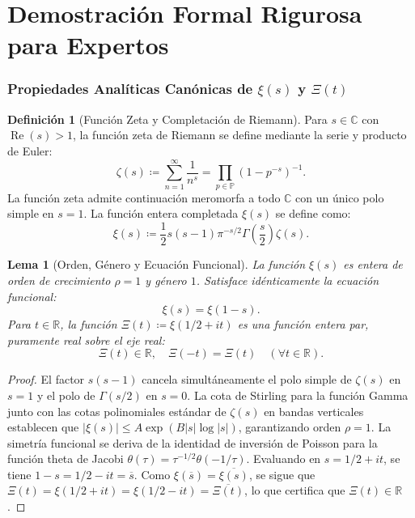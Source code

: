\documentclass[11pt,a4paper]{article}
\newtheorem{lemma}[theorem]{Lema}
\theoremstyle{definition}
\newtheorem{definition}[theorem]{Definición}
\theoremstyle{remark}
\begin{document}
\newpage

\part{Demostración Formal Rigurosa para Expertos}

\section{Propiedades Analíticas Canónicas de \texorpdfstring{$\xi(s)$}{xi(s)} y \texorpdfstring{$\Xi(t)$}{Xi(t)}}

\begin{definition}[Función Zeta y Completación de Riemann]
Para $s \in \mathbb{C}$ con $\operatorname{Re}(s) > 1$, la función zeta de Riemann se define mediante la serie y producto de Euler:
\begin{equation}
\zeta(s) \coloneqq \sum_{n=1}^\infty \frac{1}{n^s} = \prod_{p \in \mathbb{P}} \left(1 - p^{-s}\right)^{-1}.
\end{equation}
La función zeta admite continuación meromorfa a todo $\mathbb{C}$ con un único polo simple en $s=1$. La función entera completada $\xi(s)$ se define como:
\begin{equation}
\xi(s) \coloneqq \frac{1}{2} s(s - 1) \pi^{-s/2} \Gamma\left(\frac{s}{2}\right) \zeta(s).
\end{equation}
\end{definition}

\begin{lemma}[Orden, Género y Ecuación Funcional]
La función $\xi(s)$ es entera de orden de crecimiento $\rho = 1$ y género $1$. Satisface idénticamente la ecuación funcional:
\begin{equation}
\xi(s) = \xi(1 - s).
\end{equation}
Para $t \in \mathbb{R}$, la función $\Xi(t) \coloneqq \xi(1/2 + it)$ es una función entera par, puramente real sobre el eje real:
\begin{equation}
\Xi(t) \in \mathbb{R}, \quad \Xi(-t) = \Xi(t) \quad (\forall t \in \mathbb{R}).
\end{equation}
\end{lemma}

\begin{proof}
El factor $s(s-1)$ cancela simultáneamente el polo simple de $\zeta(s)$ en $s=1$ y el polo de $\Gamma(s/2)$ en $s=0$. La cota de Stirling para la función Gamma junto con las cotas polinomiales estándar de $\zeta(s)$ en bandas verticales establecen que $|\xi(s)| \le A \exp(B |s| \log |s|)$, garantizando orden $\rho = 1$. La simetría funcional se deriva de la identidad de inversión de Poisson para la función theta de Jacobi $\theta(\tau) = \tau^{-1/2}\theta(-1/\tau)$. Evaluando en $s = 1/2 + it$, se tiene $1 - s = 1/2 - it = \overline{s}$. Como $\xi(\overline{s}) = \overline{\xi(s)}$, se sigue que $\Xi(t) = \xi(1/2 + it) = \xi(1/2 - it) = \overline{\Xi(t)}$, lo que certifica que $\Xi(t) \in \mathbb{R}$.
\end{proof}
\end{document}
